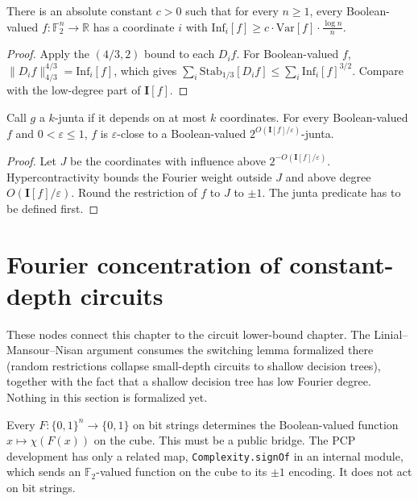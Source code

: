 \begin{theorem}
  \label{thm:analysis-kkl}
  There is an absolute constant $c > 0$ such that for every $n \ge 1$, every
  Boolean-valued $f : \mathbb{F}_2^n \to \mathbb{R}$ has a coordinate $i$ with
  $\mathrm{Inf}_i[f] \ge c \cdot \mathrm{Var}[f] \cdot \frac{\log n}{n}$.
\end{theorem}
\begin{proof}
  Apply the $(4/3, 2)$ bound to each $D_i f$. For Boolean-valued $f$,
  $\lVert D_i f \rVert_{4/3}^{4/3} = \mathrm{Inf}_i[f]$, which gives
  $\sum_i \mathrm{Stab}_{1/3}[D_i f] \le \sum_i \mathrm{Inf}_i[f]^{3/2}$. Compare
  with the low-degree part of $\mathbf{I}[f]$.
\end{proof}

\begin{theorem}
  \label{thm:analysis-friedgut}
  \notready
  Call $g$ a $k$-junta if it depends on at most $k$ coordinates. For every
  Boolean-valued $f$ and $0 < \varepsilon \le 1$, $f$ is $\varepsilon$-close to a
  Boolean-valued $2^{O(\mathbf{I}[f]/\varepsilon)}$-junta.
\end{theorem}
\begin{proof}
  Let $J$ be the coordinates with influence above
  $2^{-O(\mathbf{I}[f]/\varepsilon)}$. Hypercontractivity bounds the Fourier
  weight outside $J$ and above degree $O(\mathbf{I}[f]/\varepsilon)$. Round the
  restriction of $f$ to $J$ to $\pm 1$. The junta predicate has to be defined
  first.
\end{proof}

\section{Fourier concentration of constant-depth circuits}

These nodes connect this chapter to the circuit lower-bound chapter. The
Linial--Mansour--Nisan argument consumes the switching lemma formalized there
(random restrictions collapse small-depth circuits to shallow decision trees),
together with the fact that a shallow decision tree has low Fourier degree.
Nothing in this section is formalized yet.

\begin{definition}
  \label{def:analysis-bridge}
  Every $F : \{0,1\}^n \to \{0,1\}$ on bit strings determines the Boolean-valued
  function $x \mapsto \chi(F(x))$ on the cube. This must be a public bridge.
  The PCP development has only a related map, \texttt{Complexity.signOf} in an
  internal module, which sends an $\mathbb{F}_2$-valued function on the cube
  to its $\pm 1$ encoding. It does not act on bit strings.
\end{definition}

